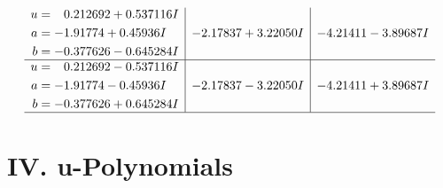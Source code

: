 \documentclass[1p]{elsarticle_modified}
\theoremstyle{definition}
\begin{document}
$$\begin{array}{c|c|c}
\begin{aligned}
u &= \phantom{-}0.212692 + 0.537116 I \\
a &= -1.91774 + 0.45936 I \\
b &= -0.377626 - 0.645284 I\end{aligned}
 & -2.17837 + 3.22050 I & -4.21411 - 3.89687 I \\ \hline\begin{aligned}
u &= \phantom{-}0.212692 - 0.537116 I \\
a &= -1.91774 - 0.45936 I \\
b &= -0.377626 + 0.645284 I\end{aligned}
 & -2.17837 - 3.22050 I & -4.21411 + 3.89687 I\\
 \hline 
 \end{array}$$\newpage
\newpage\renewcommand{\arraystretch}{1}
\centering \section*{ IV. u-Polynomials}
\end{document}

